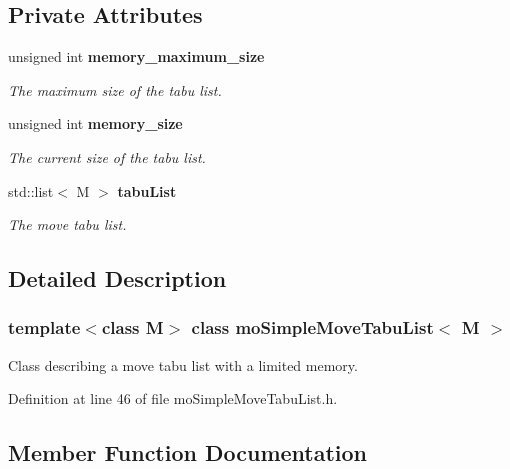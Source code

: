 \subsection*{Private Attributes}
\begin{CompactItemize}
\item 
unsigned int {\bf memory\_\-maximum\_\-size}\label{classmo_simple_move_tabu_list_r0}

\begin{CompactList}\small\item\em The maximum size of the tabu list. \item\end{CompactList}\item 
unsigned int {\bf memory\_\-size}\label{classmo_simple_move_tabu_list_r1}

\begin{CompactList}\small\item\em The current size of the tabu list. \item\end{CompactList}\item 
std::list$<$ M $>$ {\bf tabu\-List}\label{classmo_simple_move_tabu_list_r2}

\begin{CompactList}\small\item\em The move tabu list. \item\end{CompactList}\end{CompactItemize}


\subsection{Detailed Description}
\subsubsection*{template$<$class M$>$ class mo\-Simple\-Move\-Tabu\-List$<$ M $>$}

Class describing a move tabu list with a limited memory. 



Definition at line 46 of file mo\-Simple\-Move\-Tabu\-List.h.

\subsection{Member Function Documentation}

